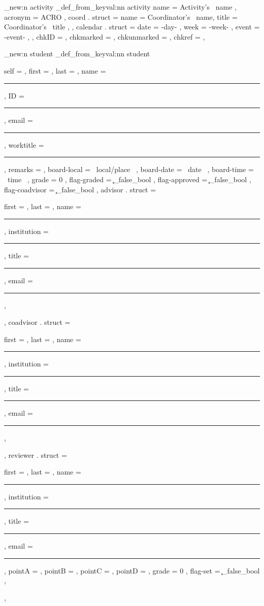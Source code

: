 \documentclass[10pt]{article}
\begin{document}
\begin{codestore}
\starray_new:n {activity}
\starray_def_from_keyval:nn {activity} {
    name = Activity's~ name ,
    acronym = ACRO ,
    coord . struct =  {
        name = Coordinator's~ name,
        title = Coordinator's~ title ,
      } ,
    calendar . struct = {
        date = {-day-} ,
        week = {-week-} ,
        event = {-event-} ,
      } ,
    chkID = ,        %
    chkmarked = ,    %
    chkunmarked = ,  %
    chkref = ,       %
  }
\end{codestore}


\begin{codestore}
\starray_new:n {student}
\starray_def_from_keyval:nn {student}
 {
  self = , %
  first = ,
  last = ,
  name = \rule{\l__stdemo_name_rule_dim}{.1pt} ,
  ID    = \rule{\l__stdemo_ID_rule_dim}{.1pt} , 
  email = \rule{\l__stdemo_email_rule_dim}{.1pt} ,
  worktitle = \rule{\l__stdemo_worktitle_rule_dim}{.1pt} ,
  remarks = ,
  board-local = {~local/place~} ,
  board-date   = {~date~} ,
  board-time  = {~time~} ,
  grade = 0 ,
  flag-graded = \c_false_bool , %
  flag-approved = \c_false_bool ,
  flag-coadvisor = \c_false_bool ,
  advisor . struct = {
    first = ,
    last =  ,
    name = \rule{\l__stdemo_name_rule_dim}{.1pt},
    institution = \rule{\l__stdemo_name_rule_dim}{.1pt},
    title = \rule{\l__stdemo_title_rule_dim}{.1pt} ,
    email = \rule{\l__stdemo_email_rule_dim}{.1pt} ,
  } ,
  coadvisor . struct = {
    first = ,
    last =  ,
    name = \rule{\l__stdemo_name_rule_dim}{.1pt},
    institution = \rule{\l__stdemo_name_rule_dim}{.1pt},
    title = \rule{\l__stdemo_title_rule_dim}{.1pt} ,
    email = \rule{\l__stdemo_email_rule_dim}{.1pt} ,
  } ,
  reviewer . struct = {
    first = ,
    last =  ,
    name = \rule{\l__stdemo_name_rule_dim}{.1pt},
    institution = \rule{\l__stdemo_name_rule_dim}{.1pt},
    title = \rule{\l__stdemo_title_rule_dim}{.1pt} ,
    email = \rule{\l__stdemo_email_rule_dim}{.1pt} ,
    pointA = ,
    pointB = ,
    pointC = ,
    pointD = ,
    grade = 0 ,
    flag-set = \c_false_bool , 
  } ,
 }
\end{codestore}

\begin{codestore}[DataRecovery]
\end{codestore}
\end{document}
